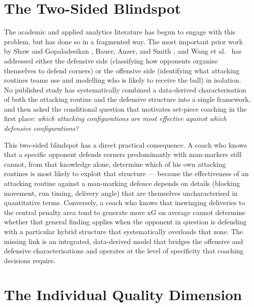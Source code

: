 \section{The Two-Sided Blindspot}
\label{sec:prob_blindspot}

The academic and applied analytics literature has begun to engage with this
problem, but has done so in a fragmented way. The most important prior work by
Shaw and Gopaladesikan \cite{ShawGopaladesikan2020}, Bauer, Anzer, and
Smith \cite{Bauer2022}, and Wang et al.\ \cite{Wang2024} has
addressed either the defensive side (classifying how opponents organise
themselves to defend corners) or the offensive side (identifying what attacking
routines teams use and modelling who is likely to receive the ball) in
isolation. No published study has systematically combined a data-derived
characterisation of both the attacking routine and the defensive structure into
a single framework, and then asked the conditional question that motivates
set-piece coaching in the first place: \emph{which attacking configurations are
most effective against which defensive configurations?}

This two-sided blindspot has a direct practical consequence. A coach who knows
that a specific opponent defends corners predominantly with man-markers still
cannot, from that knowledge alone, determine which of his own attacking routines
is most likely to exploit that structure --- because the effectiveness of an
attacking routine against a man-marking defence depends on details (blocking
movement, run timing, delivery angle) that are themselves uncharacterised in
quantitative terms. Conversely, a coach who knows that inswinging deliveries
to the central penalty area tend to generate more xG on average cannot determine
whether that general finding applies when the opponent in question is defending
with a particular hybrid structure that systematically overloads that zone.
The missing link is an integrated, data-derived model that bridges the offensive
and defensive characterisations and operates at the level of specificity that
coaching decisions require.

\section{The Individual Quality Dimension}
\label{sec:prob_player}

